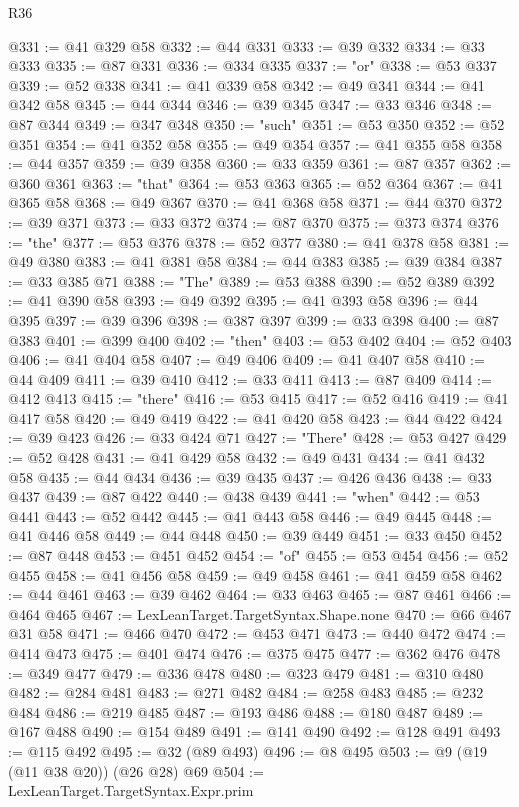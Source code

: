 \begin{lexlean}{R36}
\begin{coremodule}
@331 := @41 @329 @58
@332 := @44 @331
@333 := @39 @332
@334 := @33 @333
@335 := @87 @331
@336 := @334 @335
@337 := "or"
@338 := @53 @337
@339 := @52 @338
@341 := @41 @339 @58
@342 := @49 @341
@344 := @41 @342 @58
@345 := @44 @344
@346 := @39 @345
@347 := @33 @346
@348 := @87 @344
@349 := @347 @348
@350 := "such"
@351 := @53 @350
@352 := @52 @351
@354 := @41 @352 @58
@355 := @49 @354
@357 := @41 @355 @58
@358 := @44 @357
@359 := @39 @358
@360 := @33 @359
@361 := @87 @357
@362 := @360 @361
@363 := "that"
@364 := @53 @363
@365 := @52 @364
@367 := @41 @365 @58
@368 := @49 @367
@370 := @41 @368 @58
@371 := @44 @370
@372 := @39 @371
@373 := @33 @372
@374 := @87 @370
@375 := @373 @374
@376 := "the"
@377 := @53 @376
@378 := @52 @377
@380 := @41 @378 @58
@381 := @49 @380
@383 := @41 @381 @58
@384 := @44 @383
@385 := @39 @384
@387 := @33 @385 @71
@388 := "The"
@389 := @53 @388
@390 := @52 @389
@392 := @41 @390 @58
@393 := @49 @392
@395 := @41 @393 @58
@396 := @44 @395
@397 := @39 @396
@398 := @387 @397
@399 := @33 @398
@400 := @87 @383
@401 := @399 @400
@402 := "then"
@403 := @53 @402
@404 := @52 @403
@406 := @41 @404 @58
@407 := @49 @406
@409 := @41 @407 @58
@410 := @44 @409
@411 := @39 @410
@412 := @33 @411
@413 := @87 @409
@414 := @412 @413
@415 := "there"
@416 := @53 @415
@417 := @52 @416
@419 := @41 @417 @58
@420 := @49 @419
@422 := @41 @420 @58
@423 := @44 @422
@424 := @39 @423
@426 := @33 @424 @71
@427 := "There"
@428 := @53 @427
@429 := @52 @428
@431 := @41 @429 @58
@432 := @49 @431
@434 := @41 @432 @58
@435 := @44 @434
@436 := @39 @435
@437 := @426 @436
@438 := @33 @437
@439 := @87 @422
@440 := @438 @439
@441 := "when"
@442 := @53 @441
@443 := @52 @442
@445 := @41 @443 @58
@446 := @49 @445
@448 := @41 @446 @58
@449 := @44 @448
@450 := @39 @449
@451 := @33 @450
@452 := @87 @448
@453 := @451 @452
@454 := "of"
@455 := @53 @454
@456 := @52 @455
@458 := @41 @456 @58
@459 := @49 @458
@461 := @41 @459 @58
@462 := @44 @461
@463 := @39 @462
@464 := @33 @463
@465 := @87 @461
@466 := @464 @465
@467 := LexLeanTarget.TargetSyntax.Shape.none
@470 := @66 @467 @31 @58
@471 := @466 @470
@472 := @453 @471
@473 := @440 @472
@474 := @414 @473
@475 := @401 @474
@476 := @375 @475
@477 := @362 @476
@478 := @349 @477
@479 := @336 @478
@480 := @323 @479
@481 := @310 @480
@482 := @284 @481
@483 := @271 @482
@484 := @258 @483
@485 := @232 @484
@486 := @219 @485
@487 := @193 @486
@488 := @180 @487
@489 := @167 @488
@490 := @154 @489
@491 := @141 @490
@492 := @128 @491
@493 := @115 @492
@495 := @32 (@89 @493)
@496 := @8 @495
@503 := @9 (@19 (@11 @38 @20)) (@26 @28) @69
@504 := LexLeanTarget.TargetSyntax.Expr.prim

\end{coremodule}
\end{lexlean}
